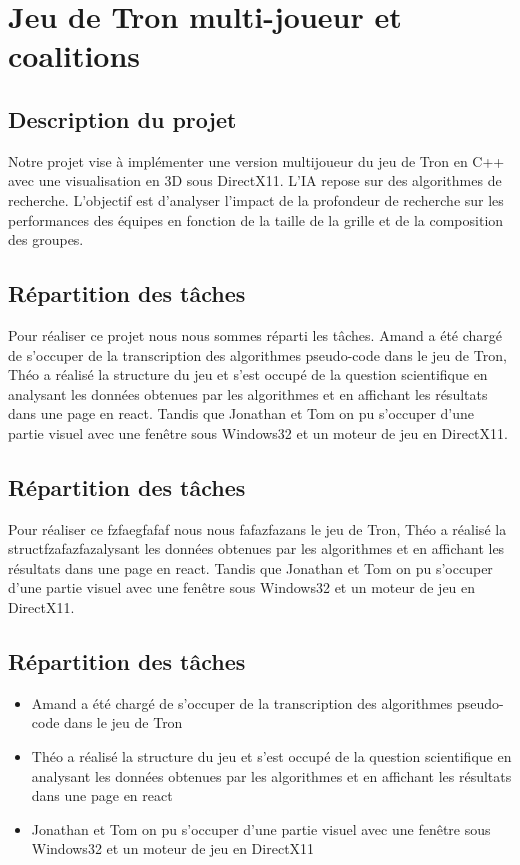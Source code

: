 \section{Jeu de Tron multi-joueur et coalitions}
\subsection{Description du projet}
Notre projet vise à implémenter une version multijoueur du jeu de Tron en C++ avec une visualisation en 3D sous DirectX11. L'IA repose sur des algorithmes de recherche. L'objectif est d'analyser l'impact de la profondeur de recherche sur les performances des équipes en fonction de la taille de la grille et de la composition des groupes.

\subsection{Répartition des tâches}
Pour réaliser ce projet nous nous sommes réparti les tâches. Amand a été chargé de s'occuper de la transcription des algorithmes pseudo-code dans le jeu de Tron, Théo a réalisé la structure du jeu et s'est occupé de la question scientifique en analysant les données obtenues par les algorithmes et en affichant les résultats dans une page en react. Tandis que Jonathan et Tom on pu s'occuper d'une partie visuel avec une fenêtre sous Windows32 et un moteur de jeu en DirectX11.

\subsection{Répartition des tâches}
Pour réaliser ce fzfaegfafaf nous nous fafazfazans le jeu de Tron, Théo a réalisé la structfzafazfazalysant les données obtenues par les algorithmes et en affichant les résultats dans une page en react. Tandis que Jonathan et Tom on pu s'occuper d'une partie visuel avec une fenêtre sous Windows32 et un moteur de jeu en DirectX11.


\subsection{Répartition des tâches}
\begin{itemize}
    \item Amand a été chargé de s'occuper de la transcription des algorithmes pseudo-code dans le jeu de Tron
    \item Théo a réalisé la structure du jeu et s'est occupé de la question scientifique en analysant les données obtenues par les algorithmes et en affichant les résultats dans une page en react
    \item Jonathan et Tom on pu s'occuper d'une partie visuel avec une fenêtre sous Windows32 et un moteur de jeu en DirectX11
\end{itemize}